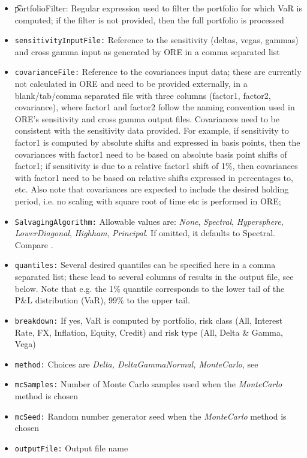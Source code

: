 \begin{itemize}
\item {\t portfolioFilter:} Regular expression used to filter the portfolio for which VaR is computed; if the filter is not provided, then the full portfolio is processed
\item {\tt sensitivityInputFile:} Reference to the sensitivity (deltas, vegas, gammas) and cross gamma input as generated by ORE in a comma separated list
\item {\tt covarianceFile:} Reference to the covariances input data; these are currently not calculated in ORE and need to be provided externally, in a blank/tab/comma separated file with three columns (factor1, factor2, covariance), where factor1 and factor2 follow the naming convention used in ORE's sensitivity and cross gamma output files. Covariances need to be consistent with the sensitivity data provided. For example, if sensitivity to factor1 is computed by absolute shifts and expressed in basis points, then the covariances with factor1 need to be based on absolute basis point shifts of factor1; if sensitivity is due to a relative factor1 shift of 1\%, then covariances with factor1 need to be based on relative shifts expressed in percentages to, etc. Also note that covariances are expected to include the desired holding period, i.e. no scaling with square root of time etc is performed in ORE;
\item {\tt SalvagingAlgorithm:} Allowable values are: {\em None}, {\em Spectral}, {\em Hypersphere}, {\em LowerDiagonal}, {\em Highham}, {\em Principal}. If omitted, it defaults to Spectral. Compare \cite{corrSalv}.
\item {\tt quantiles:} Several desired quantiles can be specified here in a comma separated list; these lead to several columns of results in the output file, see below. Note that e.g. the 1\% quantile corresponds to the lower tail of the P\&L distribution (VaR), 99\% to the upper tail.
\item {\tt breakdown:} If yes, VaR is computed by portfolio, risk class (All, Interest Rate, FX, Inflation, Equity, Credit) and risk type (All, Delta \& Gamma, Vega)
\item {\tt method:} Choices are {\em Delta, DeltaGammaNormal, MonteCarlo}, see \cite{methods}
\item {\tt mcSamples:} Number of Monte Carlo samples used when the {\em MonteCarlo} method is chosen
\item {\tt mcSeed:} Random number generator seed when the {\em MonteCarlo} method is chosen
\item {\tt outputFile:} Output file name
\end{itemize}

